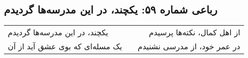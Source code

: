 \begin{center}
\section*{رباعی شماره ۵۹: یکچند، در این مدرسه‌ها گردیدم}
\label{sec:059}
\begin{longtable}{l p{0.5cm} r}
یکچند، در این مدرسه‌ها گردیدم
&&
از اهل کمال، نکته‌ها پرسیدم
\\
یک مسله‌ای که بوی عشق آید از آن
&&
در عمر خود، از مدرسی نشنیدم
\\
\end{longtable}
\end{center}
